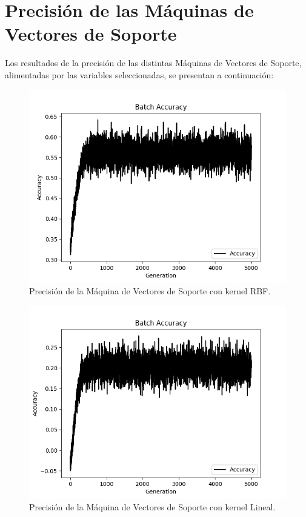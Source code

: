 \section{Precisión de las Máquinas de Vectores de Soporte}
Los resultados de la precisión de las distintas Máquinas de Vectores de Soporte, alimentadas por las variables seleccionadas, se presentan a continuación: 
\begin{figure}
    \centering
    \includegraphics[scale=0.75]{figuras/Figure_1.png}
    \caption{Precisión de la Máquina de Vectores de Soporte con kernel RBF.}
    \label{fig:my_label}
\end{figure}
\begin{figure}
    \centering
    \includegraphics[scale=0.75]{figuras/Figure_2.png}
    \caption{Precisión de la Máquina de Vectores de Soporte con kernel Lineal.}
    \label{fig:my_label}
\end{figure}
